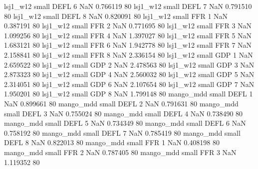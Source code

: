          lsj1_w12      small     DEFL                 6                  NaN 0.766119 80
         lsj1_w12      small     DEFL                 7                  NaN 0.791510 80
         lsj1_w12      small     DEFL                 8                  NaN 0.820091 80
         lsj1_w12      small      FFR                 1                  NaN 0.387191 80
         lsj1_w12      small      FFR                 2                  NaN 0.771695 80
         lsj1_w12      small      FFR                 3                  NaN 1.099256 80
         lsj1_w12      small      FFR                 4                  NaN 1.397027 80
         lsj1_w12      small      FFR                 5                  NaN 1.683121 80
         lsj1_w12      small      FFR                 6                  NaN 1.942778 80
         lsj1_w12      small      FFR                 7                  NaN 2.158841 80
         lsj1_w12      small      FFR                 8                  NaN 2.336154 80
         lsj1_w12      small      GDP                 1                  NaN 2.659522 80
         lsj1_w12      small      GDP                 2                  NaN 2.478563 80
         lsj1_w12      small      GDP                 3                  NaN 2.873323 80
         lsj1_w12      small      GDP                 4                  NaN 2.560032 80
         lsj1_w12      small      GDP                 5                  NaN 2.314051 80
         lsj1_w12      small      GDP                 6                  NaN 2.107654 80
         lsj1_w12      small      GDP                 7                  NaN 1.950201 80
         lsj1_w12      small      GDP                 8                  NaN 1.799148 80
        mango_mdd      small     DEFL                 1                  NaN 0.899661 80
        mango_mdd      small     DEFL                 2                  NaN 0.791631 80
        mango_mdd      small     DEFL                 3                  NaN 0.755024 80
        mango_mdd      small     DEFL                 4                  NaN 0.738490 80
        mango_mdd      small     DEFL                 5                  NaN 0.734349 80
        mango_mdd      small     DEFL                 6                  NaN 0.758192 80
        mango_mdd      small     DEFL                 7                  NaN 0.785419 80
        mango_mdd      small     DEFL                 8                  NaN 0.822013 80
        mango_mdd      small      FFR                 1                  NaN 0.408198 80
        mango_mdd      small      FFR                 2                  NaN 0.787405 80
        mango_mdd      small      FFR                 3                  NaN 1.119352 80

